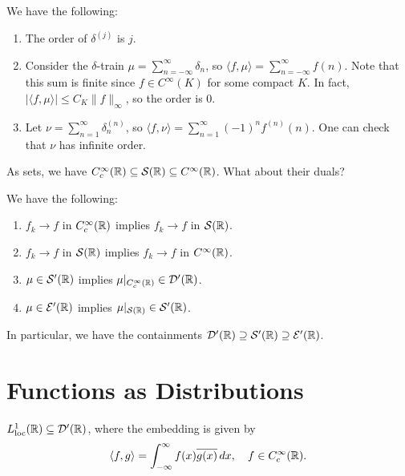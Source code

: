 \begin{example}
  We have the following:
  \begin{enumerate}
    \item The order of $\delta^{(j)}$ is $j$.
    \item Consider the $\delta$-train
      $\mu = \sum_{n = - \infty}^\infty \delta_n$,
      so $\langle f, \mu \rangle = \sum_{n = -\infty}^\infty f(n)$.
      Note that this sum is finite since
      $f \in C^\infty(K)$ for some
      compact $K$. In fact,
      $|\langle f, \mu \rangle| \le C_K \|f\|_\infty$,
      so the order is $0$.
    \item Let
      $\nu = \sum_{n = 1}^\infty \delta_n^{(n)}$,
      so $\langle f, \nu \rangle = \sum_{n = 1}^\infty (-1)^n f^{(n)}(n)$.
      One can check that $\nu$ has
      infinite order.
  \end{enumerate}
\end{example}

\begin{remark}
  As sets, we have
  $C^\infty_c(\mathbb{R}) \subseteq \mathcal{S}(\mathbb{R}) \subseteq C^\infty(\mathbb{R})$.
  What about their duals?
\end{remark}

\begin{theorem}
  We have the following:
  \begin{enumerate}
    \item $f_k \to f$ in $C^\infty_c(\mathbb{R})$
      implies $f_k \to f$ in $\mathcal{S}(\mathbb{R})$.
    \item $f_k \to f$ in $\mathcal{S}(\mathbb{R})$
      implies $f_k \to f$ in $C^\infty(\mathbb{R})$.
    \item $\mu \in \mathcal{S}'(\mathbb{R})$
      implies $\mu|_{C^\infty_c(\mathbb{R})} \in \mathcal{D}'(\mathbb{R})$.
    \item $\mu \in \mathcal{E}'(\mathbb{R})$
      implies $\mu|_{\mathcal{S}(\mathbb{R})} \in \mathcal{S}'(\mathbb{R})$.
  \end{enumerate}
  In particular, we have the
  containments
  $\mathcal{D}'(\mathbb{R}) \supseteq \mathcal{S}'(\mathbb{R}) \supseteq \mathcal{E}'(\mathbb{R})$.
\end{theorem}

\section{Functions as Distributions}

\begin{theorem}
  $L^1_{\mathrm{loc}}(\mathbb{R}) \subseteq \mathcal{D}'(\mathbb{R})$,
  where the embedding is given by
  \[
    \langle f, g \rangle
    = \int_{-\infty}^\infty f(x) \overline{g(x)} \, dx, \quad
    f \in C^\infty_c(\mathbb{R}).
  \]
\end{theorem}

